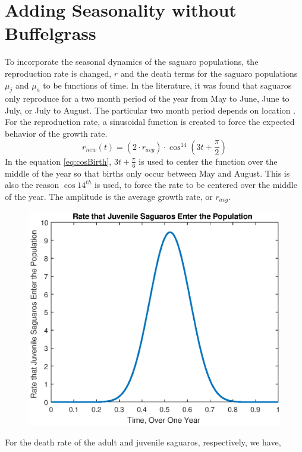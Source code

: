 \documentclass[a4paper]{article}
\begin{document}
\section{Adding Seasonality without Buffelgrass}
To incorporate the seasonal dynamics of the saguaro populations, the reproduction rate is changed, $r$ and the death terms for the saguaro populations $\mu_j$ and $\mu_a$ to be functions of time. In the literature, it was found that saguaros only reproduce for a two month period of the year from May to June, June to July, or July to August. The particular two month period depends on location \cite{SaguaroBook}. \\
For the reproduction rate, a sinusoidal function is created to force the expected behavior of the growth rate.
\begin{equation}\label{eq:cosBirth}
r_{new}(t) = (2\cdot r_{avg})\cdot \cos^{14}\left(3t+\frac{\pi}{2}\right)
\end{equation}
In the equation \ref{eq:cosBirth}, $3t+\frac{\pi}{6}$ is used to center the function over the middle of the year so that births only occur between May and August. This is also the reason $\cos14^{th}$ is used, to force the rate to be centered over the middle of the year. The amplitude is the average growth rate, or $r_{avg}$.
\begin{figure}[H]
\centering
\includegraphics[scale = 0.7]{seasonalBirth.eps}
\end{figure}
For the death rate of the adult and juvenile saguaros, respectively, we have,
\end{document}
